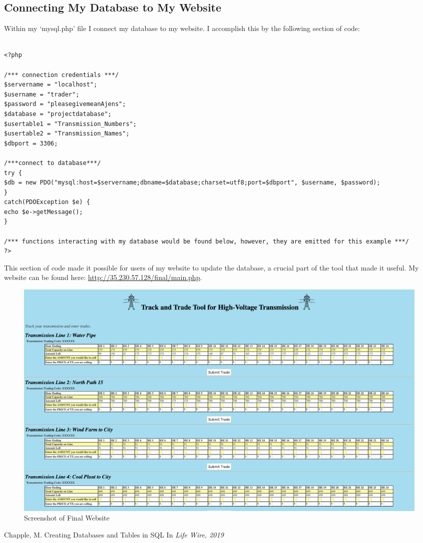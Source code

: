 \documentclass{article}
\begin{document}
\subsection{Connecting My Database to My Website}
Within my ‘mysql.php’ file I connect my database to my website. I accomplish this by the following section of code: 


\begin{lstlisting}

<?php

/*** connection credentials ***/
$servername = "localhost";
$username = "trader";
$password = "pleasegivemeanAjens";
$database = "projectdatabase";
$usertable1 = "Transmission_Numbers";
$usertable2 = "Transmission_Names";
$dbport = 3306;

/***connect to database***/
try {
$db = new PDO("mysql:host=$servername;dbname=$database;charset=utf8;port=$dbport", $username, $password);
}
catch(PDOException $e) {
echo $e->getMessage();
}

/*** functions interacting with my database would be found below, however, they are emitted for this example ***/
?>

\end{lstlisting}

This section of code made it possible for users of my website to update the database, a crucial part of the tool that made it useful. My website can be found here: \href{http://35.230.57.128/final/main.php}{http://35.230.57.128/final/main.php}. 

    \begin{figure}
        \centering
        \includegraphics[width=.9\columnwidth]{jane_fig1.png}
        \caption{Screenshot of Final Website}
        \label{fig:my_label}
    \end{figure}



  


\begin{thebibliography}{1}

Chapple, M.
\newblock Creating Databases and Tables in SQL
\newblock In {\em Life Wire, 2019}

\end{thebibliography}
\end{document}
